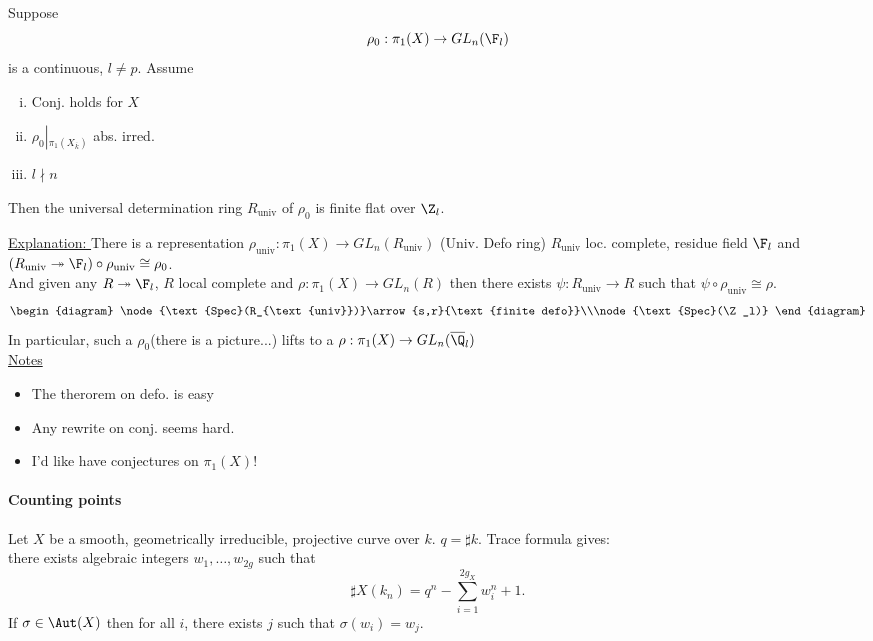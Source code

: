 \begin{thm}[dJ, 3.5] Suppose
	$$\rho_0: \pi_1(X)\to GL_n(\F_l)$$
	is a continuous, $l\neq p$. Assume
	\begin{enumerate}[(i)]
	\item Conj. holds for $X$
	\item $\rho_0\left|_{\pi_1(X_{\overline k})}\right.$ abs. irred.
	\item $l\nmid n$
	\end{enumerate}
	Then the universal determination ring $R_{\text{univ}}$ of $\rho_0$ is finite flat over $\Z_l$. 
\end{thm}

\noindent
\underline{Explanation: } There is a representation $\rho_{\text{univ}}: \pi_1(X)\to GL_n(R_{\text{univ}})$ (Univ. Defo ring) $R_{\text{univ}}$ loc. complete, residue field $\F_l$ and $(R_{\text{univ}}\twoheadrightarrow \F_l)\circ\rho_{\text{univ}}\cong\rho_0$. \\
And given any $R\twoheadrightarrow \F_l$, $R$ local complete and $\rho: \pi_1(X)\to GL_n(R)$ then there exists $\psi: R_{\text{univ}}\to R$ such that $\psi\circ\rho_{\text{univ}}\cong \rho$. 
$$\begin{diagram}
	\node{\text{Spec}(R_{\text{univ}})}\arrow{s,r}{\text{finite defo}}\\\node{\text{Spec}(\Z_l)}
\end{diagram}$$
In particular, such a $\rho_0$(there is a picture...) lifts to a $\rho: \pi_1(X)\to GL_n(\overline\Q_l)$\\

\noindent
\underline{Notes } \begin{itemize}
	\item The therorem on defo. is easy
	\item Any rewrite on conj. seems hard.
	\item I'd like have conjectures on $\pi_1(X)$!
\end{itemize}


\paragraph{Counting points} Let $X$ be a smooth, geometrically irreducible, projective curve over $k$. $q=\sharp k$. Trace formula gives:\\
there exists algebraic integers $w_1, \ldots, w_{2g}$ such that 
	$$\sharp X(k_n) = q^n-\sum_{i=1}^{2g_X}w_i^n+1.$$
If $\sigma\in \Aut(X)$ then for all $i$, there exists $j$ such that $\sigma(w_i)=w_j$. 


